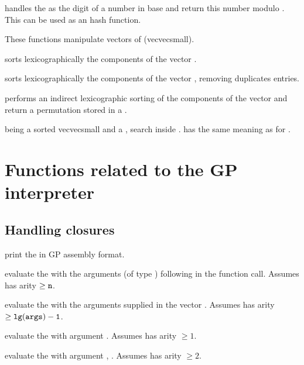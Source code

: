  handles the
  as the digit of a number in base  and return
this number modulo . This can be used as an hash function.

These functions manipulate vectors of  (vecvecsmall).

 sorts lexicographically the components of
the vector .

 sorts lexicographically the components of
the vector , removing duplicates entries.

 performs an indirect lexicographic
sorting of the components of the vector  and return a permutation
stored in a .

  being a sorted
vecvecsmall and  a , search  inside .
 has the same meaning as for .

\newpage
\chapter{Functions related to the GP interpreter}

\section{Handling closures}\label{se:closure}


 print the   in
GP assembly format.

 evaluate the 
 with the  arguments (of type ) following  in
the function call. Assumes  has arity $\geq {\tt n}$.

 evaluate the 
 with the arguments supplied in the vector . Assumes 
has arity $\geq {\tt lg(args)-1}$.

 evaluate the 
 with argument . Assumes  has arity $\geq 1$.

 evaluate the 
 with argument , . Assumes  has arity $\geq 2$.

